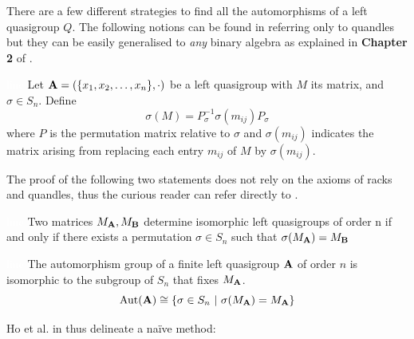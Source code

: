 \noindent There are a few different strategies to find all the automorphisms of a left quasigroup $Q$.\newline
The following notions can be found in \cite{ho2005matrices} referring only to quandles but they can be easily generalised to \emph{any} binary algebra as explained in \textbf{Chapter 2} of \cite{elhamdadi2015quandles}.
\begin{definition}\textcolor{white}{line}\newline
Let $\mathbf{A}= (\{x_1, x_2, \dots, x_n\}, \cdot)$ be a left quasigroup with $M$ its matrix, and $\sigma \in S_n$. Define
\[\sigma(M) = P^{-1}_\sigma\sigma(m_{ij})P_\sigma\]
where $P$ is the permutation matrix relative to $\sigma$ and $\sigma(m_{ij})$ indicates the matrix arising from replacing each entry $m_{ij}$ of $M$ by $\sigma(m_{ij})$.
\end{definition}
\noindent The proof of the following two statements does not rely on the axioms of racks and quandles, thus the curious reader can refer directly to \cite{ho2005matrices}.
\begin{theorem}\textcolor{white}{line}\newline
Two matrices $M_{\mathbf{A}}, M_{\mathbf{B}}$ determine isomorphic left quasigroups of order n if and only if there exists a permutation $\sigma \in S_n$ such that $\sigma(M_{\mathbf{A}}) = M_\mathbf{B}$
\end{theorem}
\begin{corollary}\textcolor{white}{line}\newline
The automorphism group of a finite left quasigroup $\mathbf{A}$ of order $n$ is isomorphic to the subgroup of $S_n$ that fixes $M_{\mathbf{A}}$.
\[\operatorname{Aut}(\mathbf{A}) \cong \{\sigma \in S_n~|~\sigma(M_{\mathbf{A}}) = M_{\mathbf{A}}\}\]
\end{corollary}


\noindent Ho et al. in \cite{ho2005matrices} thus delineate a naïve method: \newline


